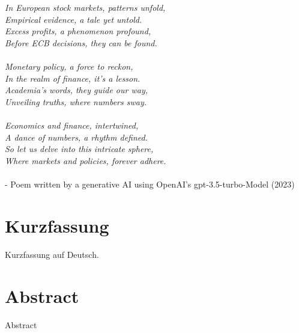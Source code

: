 

{%
	\chapter*{}


\textit{
In European stock markets, patterns unfold,\\
Empirical evidence, a tale yet untold.\\
Excess profits, a phenomenon profound,\\
Before ECB decisions, they can be found.}
\\ \\
\textit{
Monetary policy, a force to reckon,\\
In the realm of finance, it's a lesson.\\
Academia's words, they guide our way,\\
Unveiling truths, where numbers sway.}
\\ \\
\textit{
Economics and finance, intertwined,\\
A dance of numbers, a rhythm defined.\\
So let us delve into this intricate sphere,\\
Where markets and policies, forever adhere.}
\\ \\
- Poem written by a generative AI using OpenAI's gpt-3.5-turbo-Model (2023)
}


{%
	\chapter*{Kurzfassung}
	
	Kurzfassung auf Deutsch. 
}

{%
	\chapter*{Abstract}
	
	Abstract
}